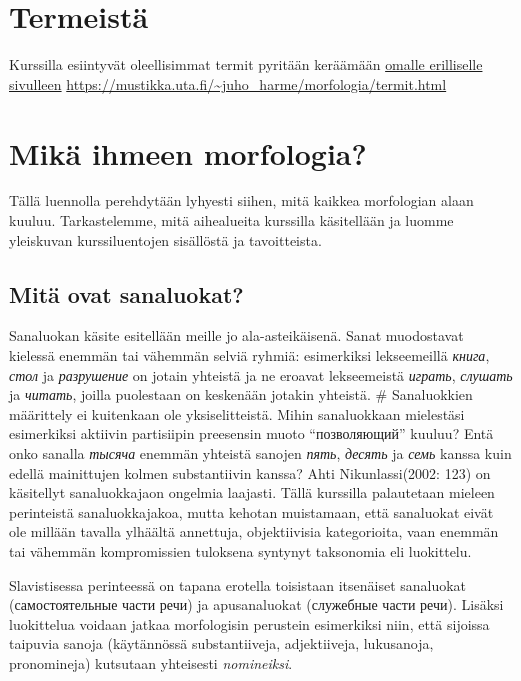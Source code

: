 \documentclass[]{scrreprt}
\begin{document}
\chapter*{Termeistä}\label{termeistuxe4}

Kurssilla esiintyvät oleellisimmat termit pyritään keräämään
\href{termit.html}{omalle erilliselle sivulleen}
\url{https://mustikka.uta.fi/~juho_harme/morfologia/termit.html}

\chapter{Mikä ihmeen morfologia?}\label{luento-1-mikuxe4-ihmeen-morfologia}


Tällä luennolla perehdytään lyhyesti siihen, mitä kaikkea morfologian
alaan kuuluu. Tarkastelemme, mitä aihealueita kurssilla käsitellään ja
luomme yleiskuvan kurssiluentojen sisällöstä ja tavoitteista.

\section{Mitä ovat sanaluokat?}\label{mituxe4-ovat-sanaluokat}

Sanaluokan käsite esitellään meille jo ala-asteikäisenä. Sanat
muodostavat kielessä enemmän tai vähemmän selviä ryhmiä: esimerkiksi
lekseemeillä \emph{книга}, \emph{стол} ja \emph{разрушение} on jotain
yhteistä ja ne eroavat lekseemeistä \emph{играть}, \emph{слушать} ja
\emph{читать}, joilla puolestaan on keskenään jotakin yhteistä. \#
Sanaluokkien määrittely ei kuitenkaan ole yksiselitteistä. Mihin
sanaluokkaan mielestäsi esimerkiksi aktiivin partisiipin preesensin
muoto ``позволяющий'' kuuluu? Entä onko sanalla \emph{тысяча} enemmän
yhteistä sanojen \emph{пять}, \emph{десять} ja \emph{семь} kanssa kuin
edellä mainittujen kolmen substantiivin kanssa? Ahti Nikunlassi(2002:
123) on käsitellyt sanaluokkajaon ongelmia laajasti. Tällä kurssilla
palautetaan mieleen perinteistä sanaluokkajakoa, mutta kehotan
muistamaan, että sanaluokat eivät ole millään tavalla ylhäältä
annettuja, objektiivisia kategorioita, vaan enemmän tai vähemmän
kompromissien tuloksena syntynyt taksonomia eli luokittelu.

Slavistisessa perinteessä on tapana erotella toisistaan itsenäiset
sanaluokat (самостоятельные части речи) ja apusanaluokat (служебные
части речи). Lisäksi luokittelua voidaan jatkaa morfologisin perustein
esimerkiksi niin, että sijoissa taipuvia sanoja (käytännössä
substantiiveja, adjektiiveja, lukusanoja, pronomineja) kutsutaan
yhteisesti \emph{nomineiksi}.
\end{document}
